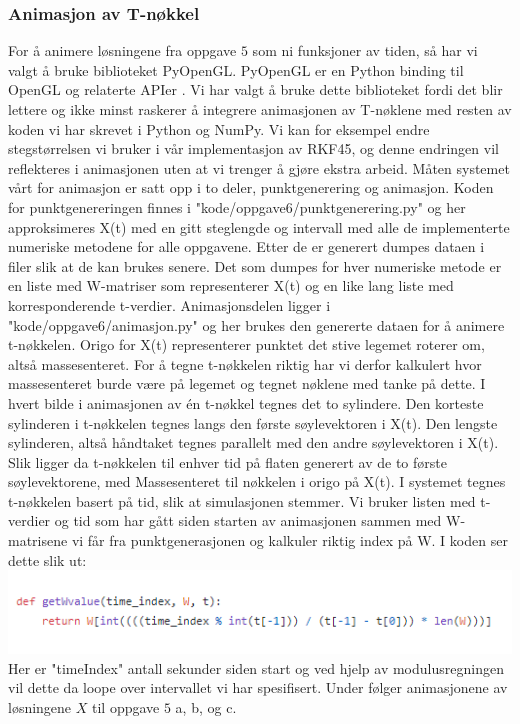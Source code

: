 \subsubsection{Animasjon av T-nøkkel}
For å animere løsningene fra oppgave $5$ som ni funksjoner av tiden, så har vi valgt å bruke biblioteket PyOpenGL. PyOpenGL er en Python binding til OpenGL og relaterte APIer \cite{PYOPENGL:1}. Vi har valgt å bruke dette biblioteket fordi det blir lettere og ikke minst raskerer å integrere animasjonen av T-nøklene med resten av koden vi har skrevet i Python og NumPy. Vi kan for eksempel endre stegstørrelsen vi bruker i vår implementasjon av RKF45, og denne endringen vil reflekteres i animasjonen uten at vi trenger å gjøre ekstra arbeid.\newline\newline
Måten systemet vårt for animasjon er satt opp i to deler, punktgenerering og animasjon. Koden for punktgenereringen finnes i "kode/oppgave6/punktgenerering.py" og her approksimeres X(t) med en gitt steglengde og intervall med alle de implementerte numeriske metodene for alle oppgavene. Etter de er generert dumpes dataen i filer slik at de kan brukes senere. Det som dumpes for hver numeriske metode er en liste med W-matriser som representerer X(t) og en like lang liste med korresponderende t-verdier. \newline\newline Animasjonsdelen ligger i "kode/oppgave6/animasjon.py" og her brukes den genererte dataen for å animere t-nøkkelen. Origo for X(t) representerer punktet det stive legemet roterer om, altså massesenteret. For å tegne t-nøkkelen riktig har vi derfor kalkulert hvor massesenteret burde være på legemet og tegnet nøklene med tanke på dette. I hvert bilde i animasjonen av én t-nøkkel tegnes det to sylindere. Den korteste sylinderen i t-nøkkelen tegnes langs den første søylevektoren i X(t). Den lengste sylinderen, altså håndtaket tegnes parallelt med den andre søylevektoren i X(t). Slik ligger da t-nøkkelen til enhver tid på flaten generert av de to første søylevektorene, med Massesenteret til nøkkelen i origo på X(t). I systemet tegnes t-nøkkelen basert på tid, slik at simulasjonen stemmer. Vi bruker listen med t-verdier og tid som har gått siden starten av animasjonen sammen med W-matrisene vi får fra punktgenerasjonen og kalkuler riktig index på W. I koden ser dette slik ut: \newline 
\includegraphics{rapport/resultat/bilder/get_w_value.PNG}
\newline
Her er "timeIndex" antall sekunder siden start og ved hjelp av modulusregningen vil dette da loope over intervallet vi har spesifisert.\newline\newline
Under følger animasjonene av løsningene $X$ til oppgave $5$ a, b, og c.

